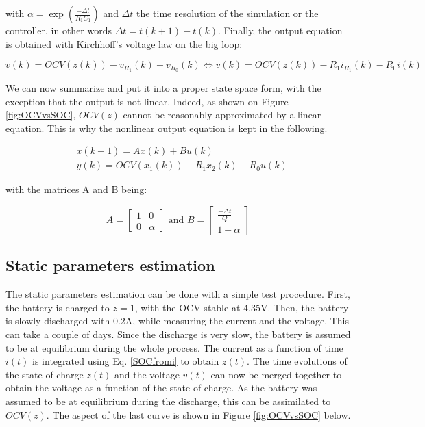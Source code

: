 \documentclass{article}
\begin{document}
\noindent with $\alpha = \exp(\frac{-\Delta t}{R_1 C_1})$ and $\Delta t$ the time resolution of the simulation or the controller, in other words $\Delta t = t(k+1) - t(k)$. Finally, the output equation is obtained with Kirchhoff's voltage law on the big loop: 

\begin{equation}
v(k) = OCV(z(k)) - v_{R_1}(k) - v_{R_0} (k) \Leftrightarrow v(k) = OCV(z(k)) - R_1 i_{R_1}(k) - R_0 i(k)
\label{eq:output}
\end{equation}

We can now summarize and put it into a proper state space form, with the exception that the output is not linear. Indeed, as shown on Figure \ref{fig:OCVvsSOC}, $OCV(z)$ cannot be reasonably approximated by a linear equation. This is why the nonlinear output equation is kept in the following. 

\begin{align}
 & x(k+1) = Ax(k) + Bu(k) \\
 & y(k) = OCV(x_1(k)) - R_1x_2(k) - R_0 u(k)
\end{align}

\noindent with the matrices A and B being: 

\[ A=\left[ \begin{array}{cc}
1 & 0 \\
0 & \alpha
\end{array} \right]
%
\text{ and } B=\left[ \begin{array}{cc}
\frac{-\Delta t}{Q} \\
1 - \alpha
\end{array} \right]
\]


\subsection{Static parameters estimation}

The static parameters estimation can be done with a simple test procedure. First, the battery is charged to $z=1$, with the OCV stable at 4.35V. Then, the battery is slowly discharged with 0.2A, while measuring the current and the voltage. This can take a couple of days. Since the discharge is very slow, the battery is assumed to be at equilibrium during the whole process. The current as a function of time  $i(t)$ is integrated using Eq. \ref{SOCfromi} to obtain $z(t)$. The time evolutions of the state of charge $z(t)$ and the voltage $v(t)$ can now be merged together to obtain the voltage as a function of the state of charge. As the battery was assumed to be at equilibrium during the discharge, this can be assimilated to $OCV(z)$. The aspect of the last curve is shown in Figure \ref{fig:OCVvsSOC} below.
\end{document}
